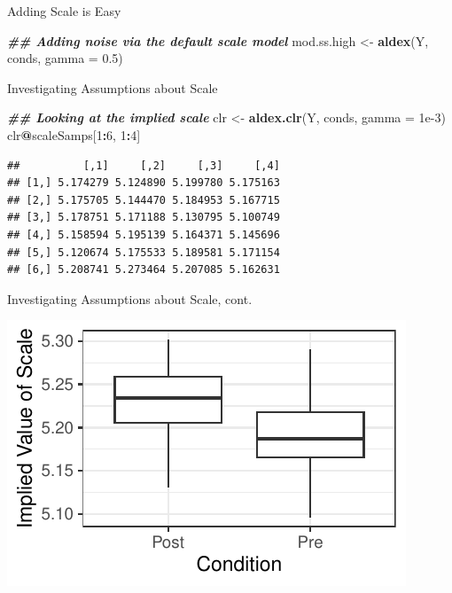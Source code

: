 \documentclass[
  ignorenonframetext,
]{beamer}
\newenvironment{Shaded}{\begin{snugshade}}{\end{snugshade}}
\newcommand{\AttributeTok}[1]{\textcolor[rgb]{0.13,0.29,0.53}{#1}}
\newcommand{\DecValTok}[1]{\textcolor[rgb]{0.00,0.00,0.81}{#1}}
\newcommand{\DocumentationTok}[1]{\textcolor[rgb]{0.56,0.35,0.01}{\textbf{\textit{#1}}}}
\newcommand{\FloatTok}[1]{\textcolor[rgb]{0.00,0.00,0.81}{#1}}
\newcommand{\FunctionTok}[1]{\textcolor[rgb]{0.13,0.29,0.53}{\textbf{#1}}}
\newcommand{\NormalTok}[1]{#1}
\newcommand{\OtherTok}[1]{\textcolor[rgb]{0.56,0.35,0.01}{#1}}
\newcommand{\SpecialCharTok}[1]{\textcolor[rgb]{0.81,0.36,0.00}{\textbf{#1}}}
\begin{document}
\begin{frame}[fragile]{Adding Scale is Easy}
\protect\hypertarget{adding-scale-is-easy}{}
\begin{Shaded}
\begin{Highlighting}[]
\DocumentationTok{\#\# Adding noise via the default scale model}
\NormalTok{mod.ss.high }\OtherTok{\textless{}{-}} \FunctionTok{aldex}\NormalTok{(Y, conds, }\AttributeTok{gamma =} \FloatTok{0.5}\NormalTok{)}
\end{Highlighting}
\end{Shaded}
\end{frame}

\begin{frame}[fragile]{Investigating Assumptions about Scale}
\protect\hypertarget{investigating-assumptions-about-scale}{}
\begin{Shaded}
\begin{Highlighting}[]
\DocumentationTok{\#\# Looking at the implied scale}
\NormalTok{clr }\OtherTok{\textless{}{-}} \FunctionTok{aldex.clr}\NormalTok{(Y, conds, }\AttributeTok{gamma =} \FloatTok{1e{-}3}\NormalTok{)}
\NormalTok{clr}\SpecialCharTok{@}\NormalTok{scaleSamps[}\DecValTok{1}\SpecialCharTok{:}\DecValTok{6}\NormalTok{, }\DecValTok{1}\SpecialCharTok{:}\DecValTok{4}\NormalTok{]}
\end{Highlighting}
\end{Shaded}

\begin{verbatim}
##          [,1]     [,2]     [,3]     [,4]
## [1,] 5.174279 5.124890 5.199780 5.175163
## [2,] 5.175705 5.144470 5.184953 5.167715
## [3,] 5.178751 5.171188 5.130795 5.100749
## [4,] 5.158594 5.195139 5.164371 5.145696
## [5,] 5.120674 5.175533 5.189581 5.171154
## [6,] 5.208741 5.273464 5.207085 5.162631
\end{verbatim}
\end{frame}

\begin{frame}{Investigating Assumptions about Scale, cont.}
\protect\hypertarget{investigating-assumptions-about-scale-cont.}{}
\begin{center}\includegraphics{slides_files/figure-beamer/unnamed-chunk-6-1} \end{center}
\end{frame}
\end{document}
